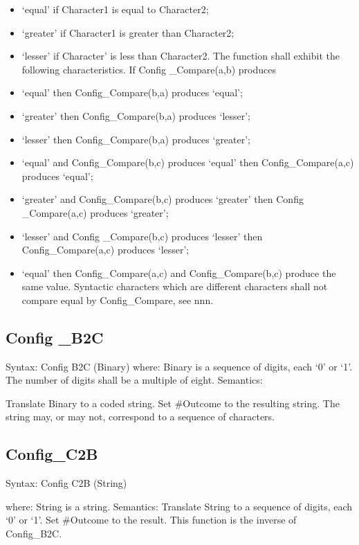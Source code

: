 \begin{itemize}
\item
  `equal' if Character1 is equal to Character2;
\item
  `greater' if Character1 is greater than Character2;
\item
  `lesser' if Character' is less than Character2. The function shall
  exhibit the following characteristics. If Config \_Compare(a,b)
  produces
\item
  `equal' then Config\_Compare(b,a) produces `equal';
\item
  `greater' then Config\_Compare(b,a) produces `lesser';
\item
  `lesser' then Config\_Compare(b,a) produces `greater';
\item
  `equal' and Config\_Compare(b,c) produces `equal' then
  Config\_Compare(a,c) produces `equal';
\item
  `greater' and Config\_Compare(b,c) produces `greater' then Config
  \_Compare(a,c) produces `greater';
\item
  `lesser' and Config \_Compare(b,c) produces `lesser' then
  Config\_Compare(a,c) produces `lesser';
\item
  `equal' then Config\_Compare(a,c) and Config\_Compare(b,c) produce the
  same value. Syntactic characters which are different characters shall
  not compare equal by Config\_Compare, see nnn.
\end{itemize}

\hypertarget{config-_b2c}{%
\subsection{Config \_B2C}\label{config-_b2c}}

Syntax: Config B2C (Binary) where: Binary is a sequence of digits, each
`0' or `1'. The number of digits shall be a multiple of eight.
Semantics:

Translate Binary to a coded string. Set \#Outcome to the resulting
string. The string may, or may not, correspond to a sequence of
characters.

\hypertarget{config_c2b}{%
\subsection{Config\_C2B}\label{config_c2b}}

Syntax: Config C2B (String)

where: String is a string. Semantics: Translate String to a sequence of
digits, each `0' or `1'. Set \#Outcome to the result. This function is
the inverse of Config\_B2C.

